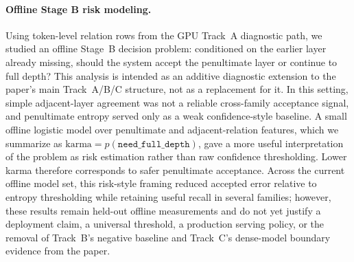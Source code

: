 
\paragraph{Offline Stage B risk modeling.}
Using token-level relation rows from the GPU Track~A diagnostic path, we studied an offline Stage~B decision problem: conditioned on the earlier layer already missing, should the system accept the penultimate layer or continue to full depth? This analysis is intended as an additive diagnostic extension to the paper's main Track~A/B/C structure, not as a replacement for it. In this setting, simple adjacent-layer agreement was not a reliable cross-family acceptance signal, and penultimate entropy served only as a weak confidence-style baseline. A small offline logistic model over penultimate and adjacent-relation features, which we summarize as $\mathrm{karma} = p(\texttt{need\_full\_depth})$, gave a more useful interpretation of the problem as risk estimation rather than raw confidence thresholding. Lower karma therefore corresponds to safer penultimate acceptance. Across the current offline model set, this risk-style framing reduced accepted error relative to entropy thresholding while retaining useful recall in several families; however, these results remain held-out offline measurements and do not yet justify a deployment claim, a universal threshold, a production serving policy, or the removal of Track~B's negative baseline and Track~C's dense-model boundary evidence from the paper.
